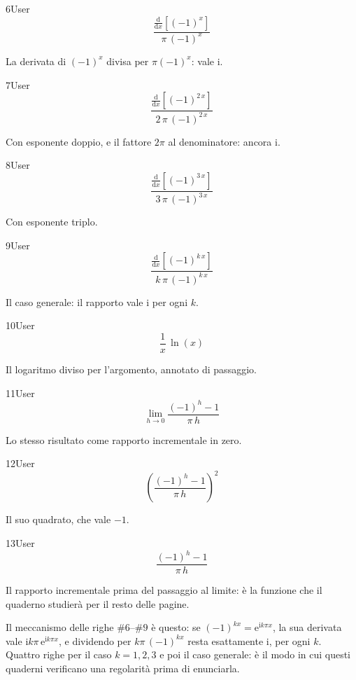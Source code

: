 \begin{espr}{6}{User}{}
\[
\frac{\frac{\mathrm{d}}{\mathrm{d}x}\!\left[\left(-1\right)^{x}\right]}{\pi\, \left(-1\right)^{x}}
\]
\end{espr}
La derivata di $(-1)^x$ divisa per $\pi(-1)^x$: vale $\mathrm{i}$.

\begin{espr}{7}{User}{}
\[
\frac{\frac{\mathrm{d}}{\mathrm{d}x}\!\left[\left(-1\right)^{2\, x}\right]}{2\, \pi\, \left(-1\right)^{2\, x}}
\]
\end{espr}
Con esponente doppio, e il fattore $2\pi$ al denominatore: ancora $\mathrm{i}$.

\begin{espr}{8}{User}{}
\[
\frac{\frac{\mathrm{d}}{\mathrm{d}x}\!\left[\left(-1\right)^{3\, x}\right]}{3\, \pi\, \left(-1\right)^{3\, x}}
\]
\end{espr}
Con esponente triplo.

\begin{espr}{9}{User}{}
\[
\frac{\frac{\mathrm{d}}{\mathrm{d}x}\!\left[\left(-1\right)^{k\, x}\right]}{k\, \pi\, \left(-1\right)^{k\, x}}
\]
\end{espr}
Il caso generale: il rapporto vale $\mathrm{i}$ per ogni $k$.

\begin{espr}{10}{User}{}
\[
\frac{1}{x}\, \ln\!\left(x\right)
\]
\end{espr}
Il logaritmo diviso per l'argomento, annotato di passaggio.

\begin{espr}{11}{User}{}
\[
\lim_{h \to 0} \frac{\left(-1\right)^{h} - 1}{\pi\, h}
\]
\end{espr}
Lo stesso risultato come rapporto incrementale in zero.

\begin{espr}{12}{User}{}
\[
\left(\frac{\left(-1\right)^{h} - 1}{\pi\, h}\right)^{2}
\]
\end{espr}
Il suo quadrato, che vale $-1$.

\begin{espr}{13}{User}{}
\[
\frac{\left(-1\right)^{h} - 1}{\pi\, h}
\]
\end{espr}
Il rapporto incrementale prima del passaggio al limite: è la funzione che il quaderno studierà per il resto delle pagine.


Il meccanismo delle righe $\#6$--$\#9$ è questo: se $(-1)^{kx}=\mathrm{e}^{\mathrm{i}k\pi x}$, la sua derivata vale $\mathrm{i}k\pi\,\mathrm{e}^{\mathrm{i}k\pi x}$, e dividendo per $k\pi\,(-1)^{kx}$ resta esattamente $\mathrm{i}$, per ogni $k$. Quattro righe per il caso $k=1,2,3$ e poi il caso generale: è il modo in cui questi quaderni verificano una regolarità prima di enunciarla.

